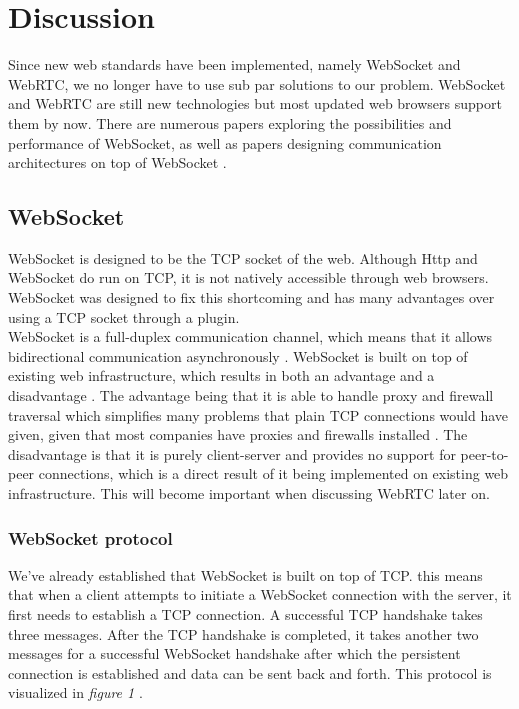 \documentclass[prodmode,acmtecs]{acmsmall}
\begin{document}
\section{Discussion}
Since new web standards have been implemented, namely WebSocket and WebRTC, we no longer have to use sub par solutions to our problem. WebSocket and WebRTC are still new technologies but most updated web browsers support them by now. There are numerous papers exploring the possibilities and performance of WebSocket, as well as papers designing communication architectures on top of WebSocket \cite{panagiotakis2013architecture}.

\subsection{WebSocket}
WebSocket is designed to be the TCP socket of the web. Although Http and WebSocket do run on TCP, it is not natively accessible through web browsers. WebSocket was designed to fix this shortcoming and has many advantages over using a TCP socket through a plugin. \\

WebSocket is a full-duplex communication channel, which means that it allows bidirectional communication asynchronously \cite{rakhundereal}. WebSocket is built on top of existing web infrastructure, which results in both an advantage and a disadvantage \cite{skvorc2014performance}. The advantage being that it is able to handle proxy and firewall traversal which simplifies many problems that plain TCP connections would have given, given that most companies have proxies and firewalls installed \cite{almasi2013evaluation}. The disadvantage is that it is purely client-server and provides no support for peer-to-peer connections, which is a direct result of it being implemented on existing web infrastructure. This will become important when discussing WebRTC later on. \\

\subsubsection{WebSocket protocol}
We've already established that WebSocket is built on top of TCP. this means that when a client attempts to initiate a WebSocket connection with the server, it first needs to establish a TCP connection. A successful TCP handshake takes three messages. After the TCP handshake is completed, it takes another two messages for a successful WebSocket handshake after which the persistent connection is established and data can be sent back and forth. This protocol is visualized in \textit{figure 1} \cite{skvorc2014performance}.
\end{document}
